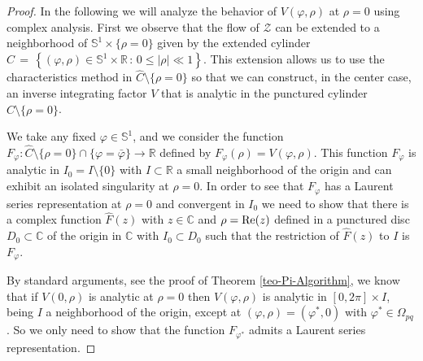 \documentclass[12pt]{amsart}
\begin{document}
\begin{proof}
In the following we will analyze the behavior of $V(\varphi, \rho)$ at $\rho=0$ using complex analysis. First we observe that the flow of $\mathcal{Z}$ can be extended to a neighborhood of $\mathbb{S}^1 \times \{\rho=0\}$ given by the extended cylinder $\hat{C}  \, = \, \left\{ (\varphi, \rho) \in \mathbb{S}^1 \times \mathbb{R} \, : \, 0 \leq |\rho| \ll 1 \right\}$. This extension allows us to use the characteristics  method in $\hat{C} \setminus \{ \rho=0 \}$ so that we can construct, in the center case, an inverse integrating factor $V$ that is analytic in the punctured cylinder $\hat{C} \setminus \{ \rho=0 \}$.

We take any fixed $\varphi \in  \mathbb{S}^1$, and we consider the function $F_{\varphi} : \hat{C} \setminus \{ \rho=0 \} \cap \{ \varphi = \bar{\varphi} \} \to \mathbb{R}$ defined by $F_{\varphi}(\rho) = V(\varphi, \rho)$. This function $F_{\varphi}$ is analytic in $I_0 = I \setminus \{0\}$ with $I \subset \mathbb{R}$ a small neighborhood of the origin and can exhibit an isolated singularity at $\rho=0$. In order to see that $F_{\varphi}$ has a Laurent series representation at $\rho=0$ and convergent in $I_0$ we need to show that there is a complex function $\hat{F}(z)$ with $z \in \mathbb{C}$ and $\rho = {\rm Re}(z)$ defined in a punctured disc $D_0 \subset \mathbb{C}$ of the origin in $\mathbb{C}$ with $I_0 \subset D_0$ such that the restriction of $\hat{F}(z)$ to $I$ is $F_{\varphi}$.

By standard arguments, see the proof of Theorem \ref{teo-Pi-Algorithm}, we know that if $V(0, \rho)$ is analytic at $\rho=0$ then $V(\varphi, \rho)$ is analytic in $[0, 2\pi] \times I$,  being $I$ a neighborhood of the origin, except at $(\varphi, \rho) = (\varphi^*, 0)$ with $\varphi^* \in \Omega_{pq}$. So we only need to show that the function $F_{\varphi^*}$ admits a Laurent series representation.


\end{proof}
\end{document}
